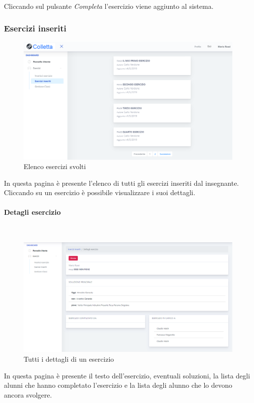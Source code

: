             Cliccando sul pulsante \textit{Completa} l'esercizio viene aggiunto al sistema.
          
\subsubsection{Esercizi inseriti}
\begin{figure}[H]
            	\centering
        		\includegraphics[width=17cm]{sez/img/insegnante/eserinseriti.PNG} 
            	\caption{Elenco esercizi svolti}\label{fig:1}
        	\end{figure}  
        	In questa pagina è presente l'elenco di tutti gli esercizi inseriti dal insegnante. Cliccando su un esercizio è possibile visualizzare i suoi dettagli.               
\newpage
\paragraph{Detagli esercizio}\mbox{}\\   

\begin{figure}[H]
            	\centering
        		\includegraphics[width=17cm]{sez/img/insegnante/detagliesercizio.PNG} 
            	\caption{Tutti i dettagli di un esercizio}\label{fig:1}
        	\end{figure}     	
        	In questa pagina è presente il testo dell'esercizio, eventuali soluzioni, la lista degli alunni che hanno completato l'esercizio e la lista degli alunno che lo devono ancora svolgere.
        	
